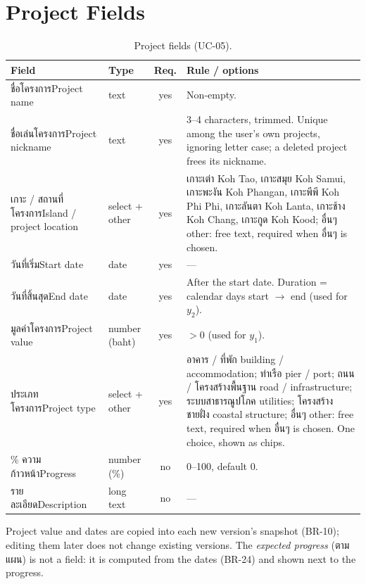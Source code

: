 \documentclass[11pt,a4paper]{article}
\newcommand{\thai}[1]{{\thaifont #1}}
\begin{document}
\clearpage
\section{Project Fields}\label{sec:proj}
\begin{longtable}{@{}R{4.6cm} l c R{7.2cm}@{}}
\caption{Project fields (UC-05).}\label{tab:proj}\\
\toprule
{}Field & Type & Req. & Rule / options \\
\midrule
\endhead
\thai{ชื่อโครงการ}\newline Project name & text & yes & Non-empty. \\
\thai{ชื่อเล่นโครงการ}\newline Project nickname & text & yes & 3--4 characters, trimmed. Unique among the user's own projects, ignoring letter case; a deleted project frees its nickname. \\
\thai{เกาะ / สถานที่โครงการ}\newline Island / project location & select + other & yes & \thai{เกาะเต่า} Koh Tao, \thai{เกาะสมุย} Koh Samui, \thai{เกาะพะงัน} Koh Phangan, \thai{เกาะพีพี} Koh Phi Phi, \thai{เกาะลันตา} Koh Lanta, \thai{เกาะช้าง} Koh Chang, \thai{เกาะกูด} Koh Kood; \thai{อื่นๆ} other: free text, required when \thai{อื่นๆ} is chosen. \\
\thai{วันที่เริ่ม}\newline Start date & date & yes & --- \\
\thai{วันที่สิ้นสุด}\newline End date & date & yes & After the start date. Duration = calendar days start $\to$ end (used for $y_2$). \\
\thai{มูลค่าโครงการ}\newline Project value & number (baht) & yes & $> 0$ (used for $y_1$). \\
\thai{ประเภทโครงการ}\newline Project type & select + other & yes & \thai{อาคาร / ที่พัก} building / accommodation; \thai{ท่าเรือ} pier / port; \thai{ถนน / โครงสร้างพื้นฐาน} road / infrastructure; \thai{ระบบสาธารณูปโภค} utilities; \thai{โครงสร้างชายฝั่ง} coastal structure; \thai{อื่นๆ} other: free text, required when \thai{อื่นๆ} is chosen. One choice, shown as chips. \\
\thai{\% ความก้าวหน้า}\newline Progress & number (\%) & no & 0--100, default 0. \\
\thai{รายละเอียด}\newline Description & long text & no & --- \\
\bottomrule
\end{longtable}
\noindent Project value and dates are copied into each new version's snapshot (BR-10); editing them later does not change existing versions. The \emph{expected progress} (\thai{ตามแผน}) is not a field: it is computed from the dates (BR-24) and shown next to the progress.
\end{document}
